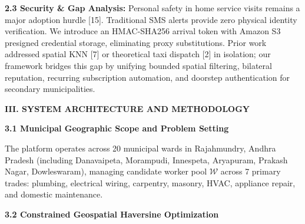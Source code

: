 \documentclass[10pt,twocolumn,a4paper]{article}
\begin{document}
\vspace{0.25em}
\noindent
\textbf{2.3 Security \& Gap Analysis:} Personal safety in home service visits remains a major adoption hurdle [15]. Traditional SMS alerts provide zero physical identity verification. We introduce an HMAC-SHA256 arrival token with Amazon S3 presigned credential storage, eliminating proxy substitutions. Prior work addressed spatial KNN [7] or theoretical taxi dispatch [2] in isolation; our framework bridges this gap by unifying bounded spatial filtering, bilateral reputation, recurring subscription automation, and doorstep authentication for secondary municipalities.

\vspace{0.35em}
\noindent
\textbf{\large III. SYSTEM ARCHITECTURE AND METHODOLOGY}

\vspace{0.2em}
\noindent
\textbf{3.1 Municipal Geographic Scope and Problem Setting}

The platform operates across 20 municipal wards in Rajahmundry, Andhra Pradesh (including Danavaipeta, Morampudi, Innespeta, Aryapuram, Prakash Nagar, Dowleswaram), managing candidate worker pool $\mathcal{W}$ across 7 primary trades: plumbing, electrical wiring, carpentry, masonry, HVAC, appliance repair, and domestic maintenance.

\vspace{0.25em}
\noindent
\textbf{3.2 Constrained Geospatial Haversine Optimization}
\end{document}
